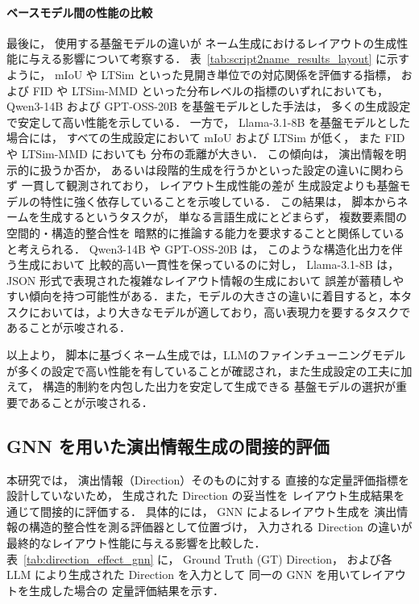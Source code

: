 \documentclass[a4j,12pt,dvipdfmx]{jsreport}
\begin{document}
\paragraph{ベースモデル間の性能の比較}
最後に，
使用する基盤モデルの違いが
ネーム生成におけるレイアウトの生成性能に与える影響について考察する．
表~\ref{tab:script2name_results_layout} に示すように，
mIoU や LTSim といった見開き単位での対応関係を評価する指標，
および FID や LTSim-MMD といった分布レベルの指標のいずれにおいても，
Qwen3-14B および GPT-OSS-20B を基盤モデルとした手法は，
多くの生成設定で安定して高い性能を示している．
一方で，
Llama-3.1-8B を基盤モデルとした場合には，
すべての生成設定において
mIoU および LTSim が低く，
また FID や LTSim-MMD においても
分布の乖離が大きい．
この傾向は，
演出情報を明示的に扱うか否か，
あるいは段階的生成を行うかといった設定の違いに関わらず
一貫して観測されており，
レイアウト生成性能の差が
生成設定よりも基盤モデルの特性に強く依存していることを示唆している．
この結果は，
脚本からネームを生成するというタスクが，
単なる言語生成にとどまらず，
複数要素間の空間的・構造的整合性を
暗黙的に推論する能力を要求することと関係していると考えられる．
Qwen3-14B や GPT-OSS-20B は，
このような構造化出力を伴う生成において
比較的高い一貫性を保っているのに対し，
Llama-3.1-8B は，
JSON 形式で表現された複雑なレイアウト情報の生成において
誤差が蓄積しやすい傾向を持つ可能性がある．また，モデルの大きさの違いに着目すると，本タスクにおいては，より大きなモデルが適しており，高い表現力を要するタスクであることが示唆される．

以上より，
脚本に基づくネーム生成では，LLMのファインチューニングモデルが多くの設定で高い性能を有していることが確認され，また生成設定の工夫に加えて，
構造的制約を内包した出力を安定して生成できる
基盤モデルの選択が重要であることが示唆される．

\subsection{GNN を用いた演出情報生成の間接的評価}
本研究では，
演出情報（Direction）そのものに対する
直接的な定量評価指標を設計していないため，
生成された Direction の妥当性を
レイアウト生成結果を通じて間接的に評価する．
具体的には，
GNN によるレイアウト生成を
演出情報の構造的整合性を測る評価器として位置づけ，
入力される Direction の違いが
最終的なレイアウト性能に与える影響を比較した．
表~\ref{tab:direction_effect_gnn} に，
Ground Truth (GT) Direction，
および各 LLM により生成された Direction を入力として
同一の GNN を用いてレイアウトを生成した場合の
定量評価結果を示す．
\end{document}
